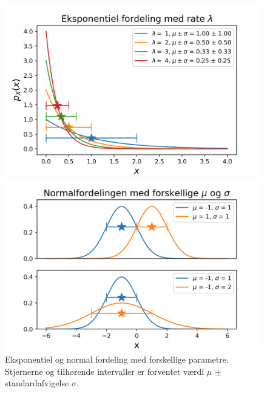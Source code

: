 \begin{figure}
\centering
\begin{minipage}[b][][b]{.45\textwidth}
\centering
\includegraphics[width = \textwidth]{exp_dist.png}
\end{minipage}
\begin{minipage}[b][][b]{.45\textwidth}
\centering
\includegraphics[width = \textwidth]{normal.png}
\end{minipage}
\caption{Eksponentiel og normal fordeling med forskellige parametre. Stjernerne og tilhørende intervaller er forventet værdi $\mu$ $\pm$ standardafvigelse $\sigma$.} \label{fig:expnorm}
\end{figure}
